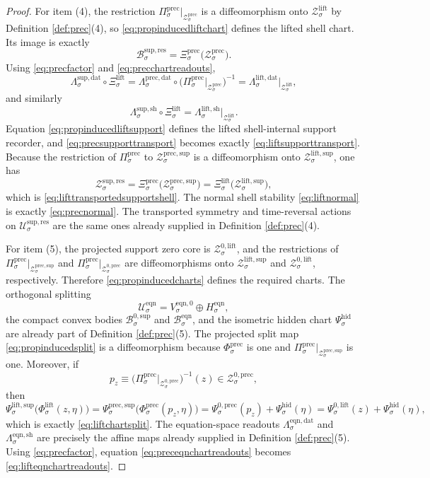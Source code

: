 \documentclass[11pt]{article}
\newcommand{\EqnSpace}[1]{\mathcal U_{#1}^{\mathrm{eqn}}}
\newcommand{\EqnBody}[1]{\mathcal B_{#1}^{\mathrm{eqn}}}
\newcommand{\EqnData}[1]{\Lambda_{#1}^{\mathrm{eqn,dat}}}
\newcommand{\EqnShell}[1]{\Lambda_{#1}^{\mathrm{eqn,sh}}}
\newcommand{\EqnHidden}[1]{H_{#1}^{\mathrm{eqn}}}
\newcommand{\EqnZero}[1]{V_{#1}^{\mathrm{eqn},0}}
\newcommand{\ResSpace}[1]{\mathcal U_{#1}^{\mathrm{sup,res}}}
\newcommand{\ResBody}[1]{\mathcal B_{#1}^{\mathrm{sup,res}}}
\newcommand{\ResData}[1]{\Lambda_{#1}^{\mathrm{sup,dat}}}
\newcommand{\ResShellMap}[1]{\Lambda_{#1}^{\mathrm{sup,sh}}}
\newcommand{\ResShellSet}[1]{\mathcal Z_{#1}^{\mathrm{sup,res}}}
\newcommand{\HiddenChart}[1]{\Psi_{#1}^{\mathrm{hid}}}
\newcommand{\ZeroBody}[1]{\mathcal B_{#1}^{0,\mathrm{sup}}}
\newcommand{\LiftData}[1]{\Lambda_{#1}^{\mathrm{lift,dat}}}
\newcommand{\LiftShellMap}[1]{\Lambda_{#1}^{\mathrm{lift,sh}}}
\newcommand{\LiftShellSet}[1]{\mathcal Z_{#1}^{\mathrm{lift}}}
\newcommand{\LiftChart}[1]{\Xi_{#1}^{\mathrm{lift}}}
\newcommand{\LiftSupportShell}[1]{\mathcal Z_{#1}^{\mathrm{lift,sup}}}
\newcommand{\LiftZeroCore}[1]{\mathcal Z_{#1}^{0,\mathrm{lift}}}
\newcommand{\LiftEqChart}[1]{\Psi_{#1}^{\mathrm{lift,sup}}}
\newcommand{\LiftZeroChart}[1]{\Psi_{#1}^{0,\mathrm{lift}}}
\newcommand{\LiftSplit}[1]{\Phi_{#1}^{\mathrm{lift}}}
\newcommand{\PrecProj}[1]{\Pi_{#1}^{\mathrm{prec}}}
\newcommand{\PrecData}[1]{\Lambda_{#1}^{\mathrm{prec,dat}}}
\newcommand{\PrecShellSet}[1]{\mathcal Z_{#1}^{\mathrm{prec}}}
\newcommand{\PrecChart}[1]{\Xi_{#1}^{\mathrm{prec}}}
\newcommand{\PrecSupportShell}[1]{\mathcal Z_{#1}^{\mathrm{prec,sup}}}
\newcommand{\PrecZeroCore}[1]{\mathcal Z_{#1}^{0,\mathrm{prec}}}
\newcommand{\PrecEqChart}[1]{\Psi_{#1}^{\mathrm{prec,sup}}}
\newcommand{\PrecZeroChart}[1]{\Psi_{#1}^{0,\mathrm{prec}}}
\newcommand{\PrecSplit}[1]{\Phi_{#1}^{\mathrm{prec}}}
\begin{document}
\begin{proof}
For item (4), the restriction \(\PrecProj{\sigma}\big|_{\PrecShellSet{\sigma}}\) is a diffeomorphism onto \(\LiftShellSet{\sigma}\) by Definition \ref{def:prec}(4), so \eqref{eq:propinducedliftchart} defines the lifted shell chart. Its image is exactly
\[
\ResBody{\sigma}
=
\PrecChart{\sigma}\bigl(\PrecShellSet{\sigma}\bigr).
\]
Using \eqref{eq:precfactor} and \eqref{eq:precchartreadouts},
\[
\ResData{\sigma}\circ\LiftChart{\sigma}
=
\PrecData{\sigma}\circ
\bigl(\PrecProj{\sigma}\big|_{\PrecShellSet{\sigma}}\bigr)^{-1}
=
\LiftData{\sigma}\big|_{\LiftShellSet{\sigma}},
\]
and similarly
\[
\ResShellMap{\sigma}\circ\LiftChart{\sigma}
=
\LiftShellMap{\sigma}\big|_{\LiftShellSet{\sigma}}.
\]
Equation \eqref{eq:propinducedliftsupport} defines the lifted shell-internal support recorder, and \eqref{eq:precsupporttransport} becomes exactly \eqref{eq:liftsupporttransport}. Because the restriction of \(\PrecProj{\sigma}\) to \(\PrecSupportShell{\sigma}\) is a diffeomorphism onto \(\LiftSupportShell{\sigma}\), one has
\[
\ResShellSet{\sigma}
=
\PrecChart{\sigma}\bigl(\PrecSupportShell{\sigma}\bigr)
=
\LiftChart{\sigma}\bigl(\LiftSupportShell{\sigma}\bigr),
\]
which is \eqref{eq:lifttransportedsupportshell}. The normal shell stability \eqref{eq:liftnormal} is exactly \eqref{eq:precnormal}. The transported symmetry and time-reversal actions on \(\ResSpace{\sigma}\) are the same ones already supplied in Definition \ref{def:prec}(4).

For item (5), the projected support zero core is \(\LiftZeroCore{\sigma}\), and the restrictions of \(\PrecProj{\sigma}\big|_{\PrecSupportShell{\sigma}}\) and \(\PrecProj{\sigma}\big|_{\PrecZeroCore{\sigma}}\) are diffeomorphisms onto \(\LiftSupportShell{\sigma}\) and \(\LiftZeroCore{\sigma}\), respectively. Therefore \eqref{eq:propinducedcharts} defines the required charts. The orthogonal splitting
\[
\EqnSpace{\sigma}=\EqnZero{\sigma}\oplus\EqnHidden{\sigma},
\]
the compact convex bodies \(\ZeroBody{\sigma}\) and \(\EqnBody{\sigma}\), and the isometric hidden chart \(\HiddenChart{\sigma}\) are already part of Definition \ref{def:prec}(5). The projected split map \eqref{eq:propinducedsplit} is a diffeomorphism because \(\PrecSplit{\sigma}\) is one and \(\PrecProj{\sigma}\big|_{\PrecSupportShell{\sigma}}\) is one. Moreover, if
\[
p_{z}
\equiv
\bigl(\PrecProj{\sigma}\big|_{\PrecZeroCore{\sigma}}\bigr)^{-1}(z)
\in
\PrecZeroCore{\sigma},
\]
then
\[
\LiftEqChart{\sigma}\bigl(\LiftSplit{\sigma}(z,\eta)\bigr)
=
\PrecEqChart{\sigma}\bigl(\PrecSplit{\sigma}(p_{z},\eta)\bigr)
=
\PrecZeroChart{\sigma}(p_{z})+\HiddenChart{\sigma}(\eta)
=
\LiftZeroChart{\sigma}(z)+\HiddenChart{\sigma}(\eta),
\]
which is exactly \eqref{eq:liftchartsplit}. The equation-space readouts \(\EqnData{\sigma}\) and \(\EqnShell{\sigma}\) are precisely the affine maps already supplied in Definition \ref{def:prec}(5). Using \eqref{eq:precfactor}, equation \eqref{eq:preceqnchartreadouts} becomes \eqref{eq:lifteqnchartreadouts}.


\end{proof}
\end{document}
